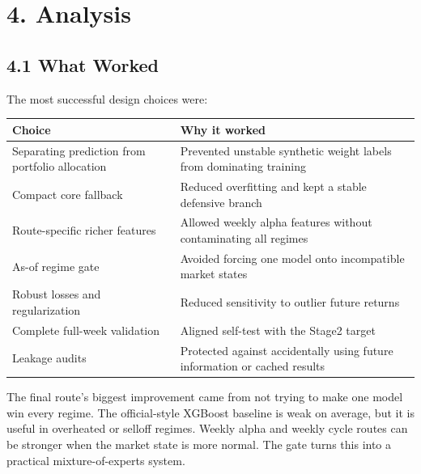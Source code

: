 \documentclass[11pt]{article}
\begin{document}
\section{4. Analysis}\label{analysis}

\subsection{4.1 What Worked}\label{what-worked}

The most successful design choices were:

\begin{longtable}[]{@{}|
  >{\RaggedRight\arraybackslash}m{}|
  >{\RaggedRight\arraybackslash}m{}|@{}}
\hline\rowcolor{tableHead}
\begin{minipage}[c]{\linewidth}\centering\bfseries
Choice
\end{minipage} & \begin{minipage}[c]{\linewidth}\centering\bfseries
Why it worked
\end{minipage} \\
\hline
\endhead
\hline
\endlastfoot
Separating prediction from portfolio allocation & Prevented unstable
synthetic weight labels from dominating training \\
\hline
Compact core fallback & Reduced overfitting and kept a stable defensive
branch \\
\hline
Route-specific richer features & Allowed weekly alpha features without
contaminating all regimes \\
\hline
As-of regime gate & Avoided forcing one model onto incompatible market
states \\
\hline
Robust losses and regularization & Reduced sensitivity to outlier future
returns \\
\hline
Complete full-week validation & Aligned self-test with the Stage2
target \\
\hline
Leakage audits & Protected against accidentally using future information
or cached results \\
\end{longtable}

The final route's biggest improvement came from not trying to make one
model win every regime. The official-style XGBoost baseline is weak on
average, but it is useful in overheated or selloff regimes. Weekly alpha
and weekly cycle routes can be stronger when the market state is more
normal. The gate turns this into a practical mixture-of-experts system.
\end{document}
